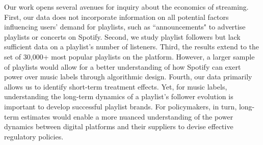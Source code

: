 Our work opens several avenues for inquiry about the economics of streaming. First, our data does not incorporate information on all potential factors influencing users' demand for playlists, such as ``announcements" to advertise playlists or concerts on Spotify. Second, we study playlist followers but lack sufficient data on a playlist's number of listeners. Third, the results extend to the set of 30,000+ most popular playlists on the platform. However, a larger sample of playlists would allow for a better understanding of how Spotify can exert power over music labels through algorithmic design. %
Fourth, our data primarily allows us to identify short-term treatment effects.
Yet, for music labels, understanding the long-term dynamics of a playlist's follower evolution is important to develop successful playlist brands. For policymakers, in turn, long-term estimates would enable a more nuanced understanding of the power dynamics between digital platforms and their suppliers to devise effective regulatory policies.



